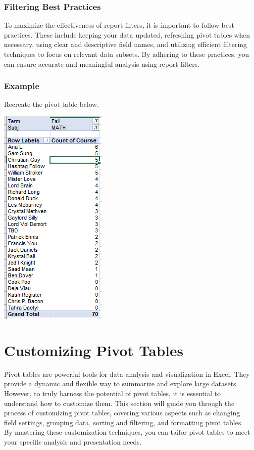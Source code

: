 \documentclass[
]{book}
\begin{document}
\hypertarget{filtering-best-practices}{%
\subsection{Filtering Best Practices}\label{filtering-best-practices}}

To maximize the effectiveness of report filters, it is important to follow best practices. These include keeping your data updated, refreshing pivot tables when necessary, using clear and descriptive field names, and utilizing efficient filtering techniques to focus on relevant data subsets. By adhering to these practices, you can ensure accurate and meaningful analysis using report filters.

\hypertarget{example-3}{%
\subsection{Example}\label{example-3}}

Recreate the pivot table below.

\includegraphics{PT3.png}

\hypertarget{customizing-pivot-tables}{%
\chapter{Customizing Pivot Tables}\label{customizing-pivot-tables}}

Pivot tables are powerful tools for data analysis and visualization in Excel. They provide a dynamic and flexible way to summarize and explore large datasets. However, to truly harness the potential of pivot tables, it is essential to understand how to customize them. This section will guide you through the process of customizing pivot tables, covering various aspects such as changing field settings, grouping data, sorting and filtering, and formatting pivot tables. By mastering these customization techniques, you can tailor pivot tables to meet your specific analysis and presentation needs.
\end{document}
